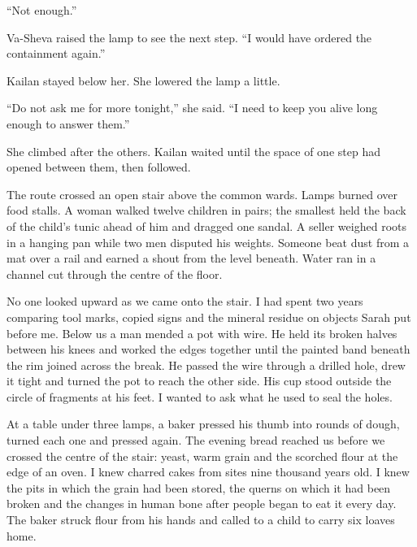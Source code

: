 ``Not enough.''\par

Va-Sheva raised the lamp to see the next step. ``I would have ordered the containment again.''\par

Kailan stayed below her. She lowered the lamp a little.\par

``Do not ask me for more tonight,'' she said. ``I need to keep you alive long enough to answer them.''\par

She climbed after the others. Kailan waited until the space of one step had opened between them, then followed.\par

\ornament

The route crossed an open stair above the common wards. Lamps burned over food stalls. A woman walked twelve children in pairs; the smallest held the back of the child's tunic ahead of him and dragged one sandal. A seller weighed roots in a hanging pan while two men disputed his weights. Someone beat dust from a mat over a rail and earned a shout from the level beneath. Water ran in a channel cut through the centre of the floor.\par

No one looked upward as we came onto the stair. I had spent two years comparing tool marks, copied signs and the mineral residue on objects Sarah put before me. Below us a man mended a pot with wire. He held its broken halves between his knees and worked the edges together until the painted band beneath the rim joined across the break. He passed the wire through a drilled hole, drew it tight and turned the pot to reach the other side. His cup stood outside the circle of fragments at his feet. I wanted to ask what he used to seal the holes.\par

At a table under three lamps, a baker pressed his thumb into rounds of dough, turned each one and pressed again. The evening bread reached us before we crossed the centre of the stair: yeast, warm grain and the scorched flour at the edge of an oven. I knew charred cakes from sites nine thousand years old. I knew the pits in which the grain had been stored, the querns on which it had been broken and the changes in human bone after people began to eat it every day. The baker struck flour from his hands and called to a child to carry six loaves home.\par


